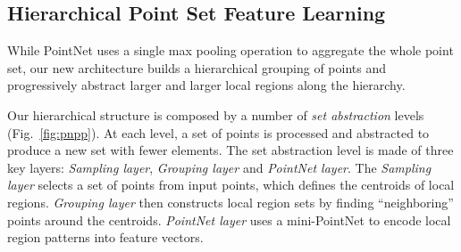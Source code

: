 


\vspace{-0.3cm}
\subsection{Hierarchical Point Set Feature Learning}
\label{sec:pointnet2}

While PointNet uses a single max pooling operation to aggregate the whole point set, our new architecture builds a hierarchical grouping of points and progressively abstract larger and larger local regions along the hierarchy. %

Our hierarchical structure is composed by a number of \emph{set abstraction} levels (Fig.~\ref{fig:pnpp}). At each level, a set of points is processed and abstracted to produce a new set with fewer elements. The set abstraction level is made of three key layers: \emph{Sampling layer}, \emph{Grouping layer} and \emph{PointNet layer}. The \emph{Sampling layer} selects a set of points from input points, which defines the centroids of local regions. \emph{Grouping layer} then constructs local region sets by finding ``neighboring'' points around the centroids. \emph{PointNet layer} uses a mini-PointNet to encode local region patterns into feature vectors.


